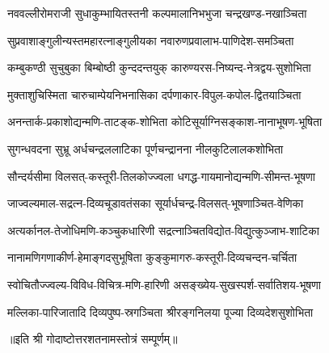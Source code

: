 \twolineshloka
{नववल्लीरोमराजी  सुधाकुम्भायितस्तनी}
{कल्पमालानिभभुजा  चन्द्रखण्ड-नखाञ्चिता}

\twolineshloka
{सुप्रवाशाङ्गुलीन्यस्तमहारत्नाङ्गुलीयका}
{नवारुणप्रवालाभ-पाणिदेश-समञ्चिता}

\twolineshloka
{कम्बुकण्ठी  सुचुबुका  बिम्बोष्ठी  कुन्ददन्तयुक्}
{कारुण्यरस-निष्यन्द-नेत्रद्वय-सुशोभिता}


\twolineshloka
{मुक्ताशुचिस्मिता  चारुचाम्पेयनिभनासिका}
{दर्पणाकार-विपुल-कपोल-द्वितयाञ्चिता}


\twolineshloka
{अनन्तार्क-प्रकाशोद्यन्मणि-ताटङ्क-शोभिता}
{कोटिसूर्याग्निसङ्काश-नानाभूषण-भूषिता}


\twolineshloka
{सुगन्धवदना  सुभ्रू  अर्धचन्द्रललाटिका}
{पूर्णचन्द्रानना  नीलकुटिलालकशोभिता}


\twolineshloka
{सौन्दर्यसीमा  विलसत्-कस्तूरी-तिलकोज्ज्वला}
{धगद्ध-गायमानोद्यन्मणि-सीमन्त-भूषणा}


\twolineshloka
{जाज्वल्यमाल-सद्रत्न-दिव्यचूडावतंसका}
{सूर्यार्धचन्द्र-विलसत्-भूषणाञ्चित-वेणिका}


\twolineshloka
{अत्यर्कानल-तेजोधिमणि-कञ्चुकधारिणी}
{सद्रत्नाञ्चितविद्योत-विद्युत्कुञ्जाभ-शाटिका}

\twolineshloka
{नानामणिगणाकीर्ण-हेमाङ्गदसुभूषिता}
{कुङ्कुमागरु-कस्तूरी-दिव्यचन्दन-चर्चिता}

\twolineshloka
{स्वोचितौज्ज्वल्य-विविध-विचित्र-मणि-हारिणी}
{असङ्ख्येय-सुखस्पर्श-सर्वातिशय-भूषणा}

\twolineshloka
{मल्लिका-पारिजातादि  दिव्यपुष्प-स्रगञ्चिता}
{श्रीरङ्गनिलया  पूज्या  दिव्यदेशसुशोभिता}

{॥इति श्री गोदाष्टोत्तरशतनामस्तोत्रं सम्पूर्णम्॥}